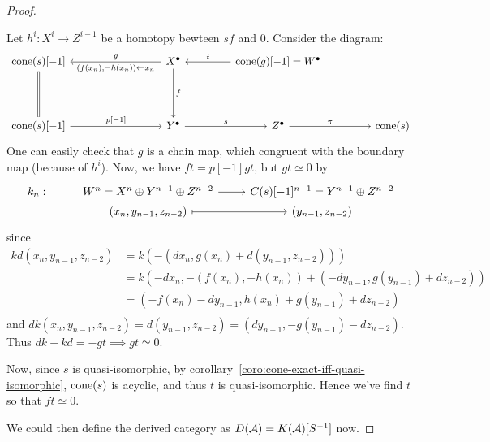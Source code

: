 \begin{theorem}
\begin{proof}
\begin{enumerate}
        Let $h^i : X^i \to Z^{i-1}$ be a homotopy bewteen $sf$ and $0$.
        Consider the diagram:
        \[ \begin{tikzcd}[column sep=1.5cm, row sep=1.5cm]
            \cone(s)[-1] \ar[rr, leftarrow, "g", "{(f(x_n), -h(x_n)) \mapsfrom x_n}"']
            \ar[d, equal] & &
            X^\bullet \ar[r, leftarrow, "t"] \ar[d, "f"] &
            \cone(g)[-1] = W^\bullet & \\
            \cone(s)[-1] \ar[rr, "{p[-1]}"] & &
            Y^\bullet \ar[r, "s"] &
            Z^\bullet \ar[r, "\pi"] &
            \cone(s)
          \end{tikzcd} \]
        One can easily check that $g$ is a chain map, which congruent
        with the boundary map (because of $h^i$). Now, we have $ft = p[-1]gt$,
        but $gt \simeq 0$ by
        \[ \begin{tikzcd}[row sep=0]
            k_n: & W^n = X^n \oplus Y^{n-1} \oplus Z^{n-2} \ar[r]
            & C(s)[-1]^{n-1} = Y^{n-1} \oplus Z^{n-2} \\
            & (x_n, y_{n-1}, z_{n-2}) \ar[r, mapsto] & (y_{n-1}, z_{n-2})
          \end{tikzcd} \]
        since
        \begin{align*}
          k d (x_n, y_{n-1}, z_{n-2})
          &= k ( -(dx_n, g(x_n) + d(y_{n-1}, z_{n-2}))) \\
          &= k (- dx_n, - (f(x_n), -h(x_n)) + (-d y_{n-1}, g(y_{n-1}) + d z_{n-2})) \\
          &= (-f(x_n) - dy_{n-1}, h(x_n) + g(y_{n-1}) + d z_{n-2}) \\
        \end{align*}
        and $dk(x_n, y_{n-1}, z_{n-2}) = d(y_{n-1}, z_{n-2}) = (d y_{n-1}, -g(y_{n-1}) - d z_{n-2})$.
        Thus $dk + kd = -gt \implies gt \simeq 0$.

        Now, since $s$ is quasi-isomorphic, by corollary~\ref{coro:cone-exact-iff-quasi-isomorphic},
        $\operatorname{cone}(s)$ is acyclic, and thus $t$ is quasi-isomorphic.
        Hence we've find $t$ so that $ft \simeq 0$.
    \end{enumerate}
    We could then define the derived category as $D(\mathcal{A}) = K(\mathcal{A})[S^{-1}]$ now.
  \end{proof}
\end{theorem}


